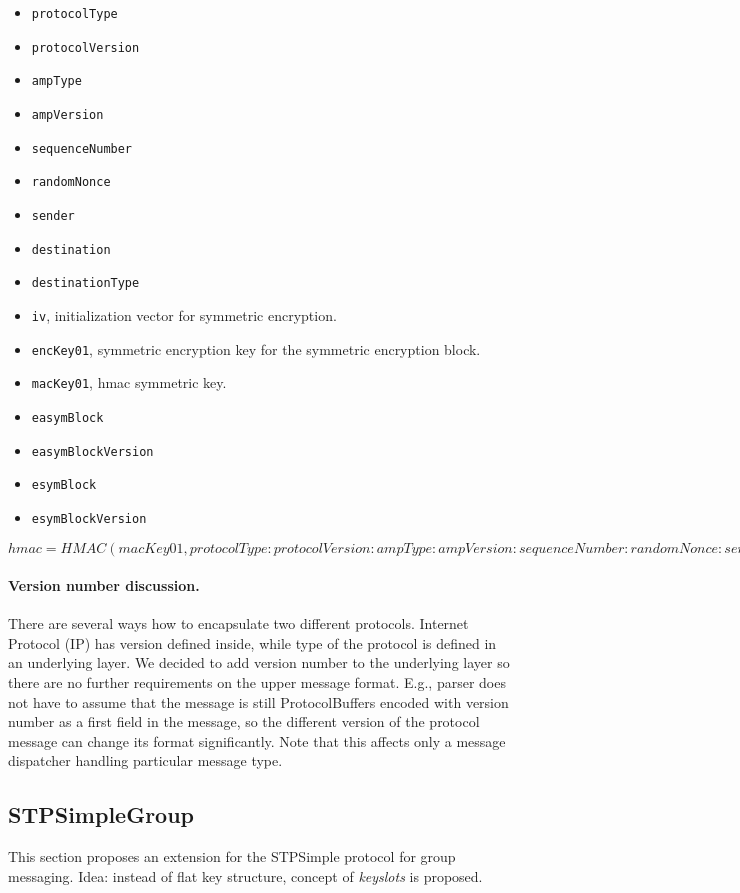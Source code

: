 \documentclass[a4paper,10pt]{article}
\begin{document}
\begin{itemize}
\begin{itemize}
 \item \verb#protocolType#
 \item \verb#protocolVersion#
 \item \verb#ampType#
 \item \verb#ampVersion#
 \item \verb#sequenceNumber#
 \item \verb#randomNonce#
 \item \verb#sender#
 \item \verb#destination#
 \item \verb#destinationType#
 \item \verb#iv#, initialization vector for symmetric encryption.
 \item \verb#encKey01#, symmetric encryption key for the symmetric encryption block.
 \item \verb#macKey01#, hmac symmetric key.
 \item \verb#easymBlock#
 \item \verb#easymBlockVersion#
 \item \verb#esymBlock#
 \item \verb#esymBlockVersion#
\end{itemize}
  
$
hmac = HMAC(macKey01, protocolType:protocolVersion:ampType:ampVersion:sequenceNumber:randomNonce:sender:
destination:destinationType:iv:encKey01:macKey01:easymBlock:easymBlockVersion:esymBlock:esymBlockVersion)) 
$
\end{itemize}

\paragraph{Version number discussion.} There are several ways how to encapsulate two different protocols.
Internet Protocol (IP) has version defined inside, while type of the protocol is defined in an underlying layer.
We decided to add version number to the underlying layer so there are no further requirements on the upper message format.
E.g., parser does not have to assume that the message is still ProtocolBuffers encoded with version number as a first field
in the message, so the different version of the protocol message can change its format significantly. Note that
this affects only a message dispatcher handling particular message type.

\subsection{STPSimpleGroup}
This section proposes an extension for the STPSimple protocol for group messaging.
Idea: instead of flat key structure, concept of \emph{keyslots} is proposed.
\end{document}
